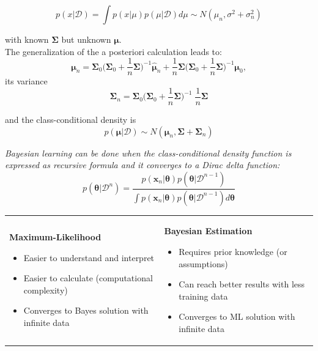   $$p(x|\mathcal{D}) = \int p(x|\mu) p(\mu|\mathcal{D}) d\mu \sim N(\mu_n, \sigma^2+\sigma_n^2)$$ 
    
  with known $\bm\Sigma$ but unknown $\bm{\mu}$.\\
  The generalization of the a posteriori calculation leads to:
  $$\bm{\mu}_n = \bm{\Sigma}_0 \Big(\bm{\Sigma}_0 + \frac1n \bm{\Sigma}\Big)^{-1}\bm{\hat{\mu}}_n +
    \frac1n \bm{\Sigma} \Big(\bm{\Sigma}_0 + \frac1n \bm{\Sigma}\Big)^{-1} \bm{\mu}_0,$$
  its variance
  $$\bm{\Sigma}_n = \bm{\Sigma}_0 \Big( \bm{\Sigma}_0 + 
    \frac1n \bm{\Sigma}\Big)^{-1}\; \frac1n{\bm{\Sigma}}$$
  
  and the class-conditional density is
  $$p(\bm{\mu}|\mathcal{D}) \sim N(\bm{\mu}_n, \bm{\Sigma} + \bm{\Sigma}_n)$$
  
  \em Bayesian learning \em can be done when the class-conditional density function is expressed 
  as recursive formula and it converges to a Dirac delta function:
  $$p(\bm{\theta} | \mathcal{D}^n) = \frac{p(\bm{x}_n|\bm{\theta}) p(\bm{\theta}| \mathcal{D}^{n-1})}
  {\int p(\bm{x}_n|\bm{\theta}) p(\bm{\theta}|\mathcal{D}^{n-1}) d\bm{\theta}}$$
  
  
  \begin{tabular}{ll}
    \parbox{9cm}{
      \textbf{Maximum-Likelihood}\\
      \begin{itemize}
        \item Easier to understand and interpret
        \item Easier to calculate (computational complexity)
        \item Converges to Bayes solution with infinite data
      \end{itemize}
    }
    & \parbox{9cm}{
      \textbf{Bayesian Estimation}\\
      \begin{itemize}
        \item Requires prior knowledge (or assumptions)
        \item Can reach better results with less training data
        \item Converges to ML solution with infinite data
      \end{itemize}
    }
  \end{tabular}
  
